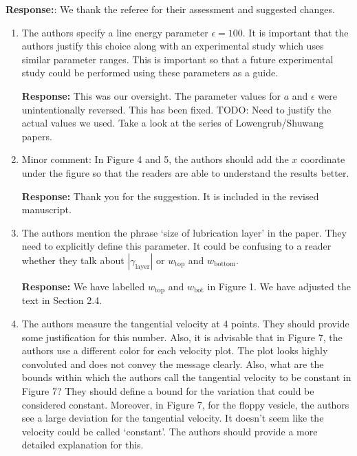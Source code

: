 \documentclass[11pt]{article}
\begin{document}
\noindent
{\bf Response:}: We thank the referee for their assessment and suggested
changes.

\begin{enumerate}
\item The authors specify a line energy parameter $\epsilon = 100$. It
  is important that the authors justify this choice along with an
    experimental study which uses similar parameter ranges. This is
    important so that a future experimental study could be performed
    using these parameters as a guide.

\noindent
{\bf Response:} This was our oversight. The parameter values for $a$ and
$\epsilon$ were unintentionally reversed. This has been fixed. TODO:
    Need to justify the actual values we used. Take a look at the series
    of Lowengrub/Shuwang papers.

\item Minor comment: In Figure 4 and 5, the authors should add the $x$
  coordinate under the figure so that the readers are able to understand
    the results better.

\noindent
{\bf Response:} Thank you for the suggestion. It is included in the
    revised manuscript.

\item The authors mention the phrase `size of lubrication layer' in the
  paper. They need to explicitly define this parameter. It could be
    confusing to a reader whether they talk about
    $|\gamma_{\mathrm{layer}}|$ or $w_{\mathrm{top}}$ and
    $w_{\mathrm{bottom}}$.

\noindent
    {\bf Response:} We have labelled $w_{\mathrm{top}}$ and
    $w_{\mathrm{bot}}$ in Figure 1. We have adjusted the text in Section
    2.4.

\item The authors measure the tangential velocity at 4 points. They
  should provide some justification for this number. Also, it is
    advisable that in Figure 7, the authors use a different color for
    each velocity plot. The plot looks highly convoluted and does not
    convey the message clearly. Also, what are the bounds within which
    the authors call the tangential velocity to be constant in Figure 7?
    They should define a bound for the variation that could be
    considered constant. Moreover, in Figure 7, for the floppy vesicle,
    the authors see a large deviation for the tangential velocity. It
    doesn't seem like the velocity could be called `constant'. The
    authors should provide a more detailed explanation for this.


\end{enumerate}
\end{document}
